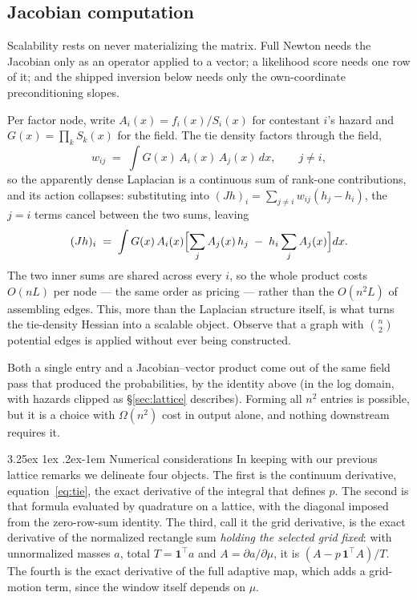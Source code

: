 \documentclass[11pt]{article}
\makeatletter
\renewcommand\paragraph{\@startsection{paragraph}{4}{\z@}%
  {3.25ex \@plus1ex \@minus.2ex}{-1em}%
  {\normalfont\normalsize\itshape}}
\makeatother
\begin{document}
\subsection{Jacobian computation}\label{sec:jaccomp}

Scalability rests on never materializing the matrix. Full Newton needs
the Jacobian only as an operator applied to a vector; a likelihood score
needs one row of it; and the shipped inversion below needs only the
own-coordinate preconditioning slopes.

Per factor node, write
$A_i(x)=f_i(x)/S_i(x)$ for contestant $i$'s hazard and
$G(x)=\prod_k S_k(x)$ for the field. The tie density factors through the
field,
\[
w_{ij}\;=\;\int G(x)\,A_i(x)\,A_j(x)\,dx ,\qquad j\ne i,
\]
so the apparently dense Laplacian is a continuous sum of rank-one
contributions, and its action collapses: substituting into
$(Jh)_i=\sum_{j\ne i}w_{ij}(h_j-h_i)$, the $j=i$ terms cancel between
the two sums, leaving
\[
(Jh)_i\;=\;\int G(x)\,A_i(x)
 \Bigl[\sum_{j} A_j(x)\,h_j\;-\;h_i\sum_{j} A_j(x)\Bigr]dx .
\]
The two inner sums are shared across every $i$, so the whole product
costs $O(nL)$ per node --- the same order as pricing --- rather than the
$O(n^2L)$ of assembling edges. This, more than the Laplacian structure
itself, is what turns the
tie-density Hessian into a scalable object. Observe that a graph with $\binom{n}{2}$
potential edges is applied without ever being constructed.

Both a single entry and a
Jacobian--vector product come out of the same field pass that produced
the probabilities, by the identity above (in the log domain, with
hazards clipped as \S\ref{sec:lattice} describes). Forming all $n^{2}$
entries is possible, but it is a choice with $\Omega(n^{2})$ cost in
output alone, and nothing downstream requires it.

\paragraph{Numerical considerations} In keeping with our
previous lattice remarks we delineate four objects. The first is the continuum
derivative, equation~\eqref{eq:tie}, the exact derivative of the integral
that defines $p$. The second is that formula evaluated by quadrature on a
lattice, with the diagonal imposed from the zero-row-sum identity. The
third, call it the grid derivative, is the exact derivative of the
normalized rectangle sum \emph{holding the selected grid fixed}: with
unnormalized masses $a$, total $T=\mathbf{1}^{\top}a$ and $A=\partial
a/\partial\mu$, it is $(A-p\,\mathbf{1}^{\top}A)/T$. The fourth is the
exact derivative of the full adaptive map, which adds a grid-motion term,
since the window itself depends on $\mu$.
\end{document}
